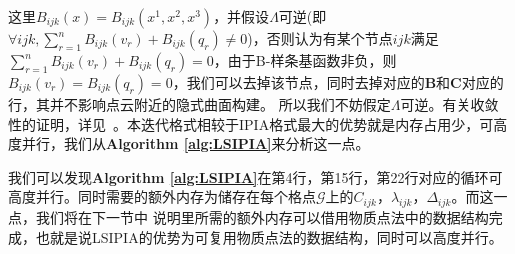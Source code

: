 这里$B_{ijk}(x) = B_{ijk}(x^1,x^2,x^3)$，并假设$\Lambda$可逆(即$\forall ijk ,\sum_{r = 1}^n B_{ijk}(v_r) +B_{ijk}(q_r) \neq 0$)，否则认为有某个节点$ijk$满足$\sum_{r = 1}^n B_{ijk}(v_r) +B_{ijk}(q_r) = 0$，由于B-样条基函数非负，则$B_{ijk}(v_r) = B_{ijk}(q_r) = 0$，我们可以去掉该节点，同时去掉对应的$\mathbf{B}$和$\mathbf{C}$对应的行，其并不影响点云附近的隐式曲面构建。
所以我们不妨假定$\Lambda$可逆。有关收敛性的证明，详见~\cite{lin2018convergence}。本迭代格式相较于IPIA格式最大的优势就是内存占用少，可高度并行，我们从\textbf{Algorithm \ref{alg:LSIPIA}}来分析这一点。

我们可以发现\textbf{Algorithm \ref{alg:LSIPIA}}在第4行，第15行，第22行对应的循环可高度并行。同时需要的额外内存为储存在每个格点$\mathcal{G}$上的$C_{ijk}$，$\lambda_{ijk}$，$\Delta_{ijk}$。而这一点，我们将在下一节中
说明里所需的额外内存可以借用物质点法中的数据结构完成，也就是说LSIPIA的优势为可复用物质点法的数据结构，同时可以高度并行。


